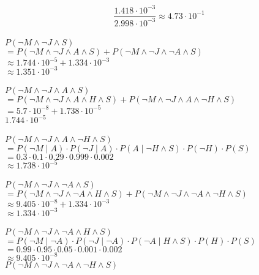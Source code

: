 \documentclass {article}
\begin{document}
$$\frac
	{1.418 \cdot 10^{-3}}
	{2.998 \cdot 10^{-3}}
	\approx 4.73 \cdot 10^{-1}
	$$
\\
$P(\neg M \land \neg J \land S)$\\
	\indent $
		= P(\neg M \land \neg J \land A \land S)
		+ P(\neg M \land \neg J \land \neg A \land S)
		$\\
	\indent $\approx 1.744 \cdot 10^{-5} + 1.334 \cdot 10^{-3}$\\
	\indent $\approx 1.351 \cdot 10^{-3}$\\
\\
$P(\neg M \land \neg J \land A \land S)$\\
	\indent $
		= P(\neg M \land \neg J \land A \land H \land S) 
		+ P(\neg M \land \neg J \land A \land \neg H \land S)$\\	\indent $
		= 5.7 \cdot 10^{-8}
		+ 1.738 \cdot 10^{-5}$\\
	\indent $ 1.744 \cdot 10^{-5} $\\
\\
$P(\neg M \land \neg J \land A \land \neg H \land S)$\\
	\indent $ 
		= P (\neg M \mid A)
		\cdot P (\neg J \mid A)
		\cdot P (A \mid \neg H \land S)
		\cdot P (\neg H)
		\cdot P (S)
		$\\
	\indent $
		= 0.3
		\cdot 0.1
		\cdot 0.29
		\cdot 0.999
		\cdot 0.002
	$\\
	\indent $ \approx 1.738 \cdot 10^{-5}$\\
\\
$P(\neg M \land \neg J \land \neg A \land S)$\\
	\indent $
		= P(\neg M \land \neg J \land \neg A \land H \land S) 
		+ P(\neg M \land \neg J \land \neg A \land \neg H \land S)$\\
	\indent $
		\approx 9.405 \cdot 10^{-8}
		+ 1.334 \cdot 10^{-3}
		$\\
	\indent $\approx 1.334 \cdot 10^{-3}$\\
\\
$P(\neg M \land \neg J \land \neg A \land H \land S)$\\
	\indent $
		= P(\neg M \mid \neg A)
		\cdot P(\neg J \mid \neg A)
		\cdot P(\neg A \mid H \land S)
		\cdot P(H)
		\cdot P(S)
		$\\
	\indent $
		= 0.99
		\cdot 0.95
		\cdot 0.05
		\cdot 0.001
		\cdot 0.002
		$\\
	\indent $
		\approx 9.405 \cdot 10 ^{-8}
	$
\\
$P(\neg M \land \neg J \land \neg A \land \neg H \land S)$\\
\end{document}
